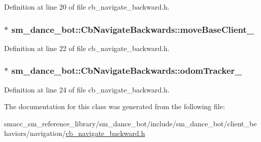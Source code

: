 Definition at line 20 of file cb\+\_\+navigate\+\_\+backward.\+h.

\subsubsection[{\texorpdfstring{move\+Base\+Client\+\_\+}{moveBaseClient_}}]{$\ast$ sm\+\_\+dance\+\_\+bot\+::\+Cb\+Navigate\+Backwards\+::move\+Base\+Client\+\_\+}\hypertarget{classsm__dance__bot_1_1CbNavigateBackwards_afd9d7176c5bcc58368ecc08274cf2e01}{}\label{classsm__dance__bot_1_1CbNavigateBackwards_afd9d7176c5bcc58368ecc08274cf2e01}


Definition at line 22 of file cb\+\_\+navigate\+\_\+backward.\+h.

\subsubsection[{\texorpdfstring{odom\+Tracker\+\_\+}{odomTracker_}}]{$\ast$ sm\+\_\+dance\+\_\+bot\+::\+Cb\+Navigate\+Backwards\+::odom\+Tracker\+\_\+}\hypertarget{classsm__dance__bot_1_1CbNavigateBackwards_a2fd4de5f0f4f7bf374d8bfbfd87c6bf2}{}\label{classsm__dance__bot_1_1CbNavigateBackwards_a2fd4de5f0f4f7bf374d8bfbfd87c6bf2}


Definition at line 24 of file cb\+\_\+navigate\+\_\+backward.\+h.



The documentation for this class was generated from the following file\+:\begin{DoxyCompactItemize}
\item 
smacc\+\_\+sm\+\_\+reference\+\_\+library/sm\+\_\+dance\+\_\+bot/include/sm\+\_\+dance\+\_\+bot/client\+\_\+behaviors/navigation/\hyperlink{cb__navigate__backward_8h}{cb\+\_\+navigate\+\_\+backward.\+h}\end{DoxyCompactItemize}
